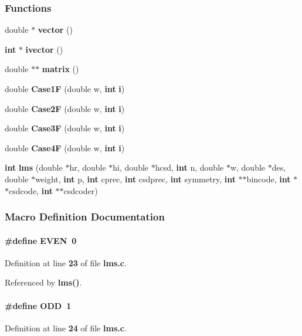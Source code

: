 \subsubsection*{Functions}
\begin{DoxyCompactItemize}
\item 
double $\ast$ {\bf vector} ()
\item 
{\bf int} $\ast$ {\bf ivector} ()
\item 
double $\ast$$\ast$ {\bf matrix} ()
\item 
double {\bf Case1F} (double w, {\bf int} {\bf i})
\item 
double {\bf Case2F} (double w, {\bf int} {\bf i})
\item 
double {\bf Case3F} (double w, {\bf int} {\bf i})
\item 
double {\bf Case4F} (double w, {\bf int} {\bf i})
\item 
{\bf int} {\bf lms} (double $\ast$hr, double $\ast$hi, double $\ast$hcsd, {\bf int} n, double $\ast$w, double $\ast$des, double $\ast$weight, {\bf int} p, {\bf int} cprec, {\bf int} csdprec, {\bf int} symmetry, {\bf int} $\ast$$\ast$bincode, {\bf int} $\ast$$\ast$csdcode, {\bf int} $\ast$$\ast$csdcoder)
\end{DoxyCompactItemize}


\subsubsection{Macro Definition Documentation}
\paragraph[{E\+V\+EN}]{\setlength{\rightskip}{0pt plus 5cm}\#define E\+V\+EN~0}\label{lms_8c_a0ecdd7deb868e0319b01e42a1d9db86a}


Definition at line {\bf 23} of file {\bf lms.\+c}.



Referenced by {\bf lms()}.

\paragraph[{O\+DD}]{\setlength{\rightskip}{0pt plus 5cm}\#define O\+DD~1}\label{lms_8c_a9fa4b8c9552dae40afdc18558bfd4893}


Definition at line {\bf 24} of file {\bf lms.\+c}.



